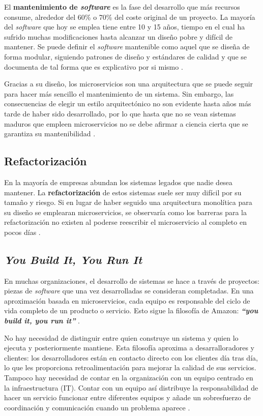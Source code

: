\documentclass[11pt,spanish,listoffigures]{tfgetsinf}
\begin{document}
El \textbf{mantenimiento de \textit{software}} es la fase del desarrollo que más recursos consume, alrededor del 60\% o 70\% del coste original de un proyecto. La mayoría del \textit{software} que hoy se emplea tiene entre 10 y 15 años, tiempo en el cual ha sufrido muchas modificaciones hasta alcanzar un diseño pobre y difícil de mantener. Se puede definir el \textit{software} mantenible como aquel que se diseña de forma modular, siguiendo patrones de diseño y estándares de calidad y que se documenta de tal forma que es explicativo por si mismo \cite{Pressman}.

Gracias a su diseño, los microservicios son una arquitectura que se puede seguir para hacer más sencillo el mantenimiento de un sistema. Sin embargo, las consecuencias de elegir un estilo arquitectónico no son evidente hasta años más tarde de haber sido desarrollado, por lo que hasta que no se vean sistemas maduros que empleen microservicios no se debe afirmar a ciencia cierta que se garantiza su mantenibilidad \cite{Lewis2014}.

\subsection{Refactorización}


En la mayoría de empresas abundan los sistemas legados que nadie desea mantener. La \textbf{refactorización} de estos sistemas suele ser muy difícil por su tamaño y riesgo. Si en lugar de haber seguido una arquitectura monolítica para su diseño se emplearan microservicios, se observaría como los barreras para la refactorización no existen al poderse reescribir el microservicio al completo en pocos días \cite{Eaves2014}.

\subsection{\textit{You Build It, You Run It}}

En muchas organizaciones, el desarrollo de sistemas se hace a través de proyectos: piezas de \textit{software} que una vez desarrolladas se consideran completadas. En una aproximación basada en microservicios, cada equipo es responsable del ciclo de vida completo de un producto o servicio. Esto sigue la filosofía de Amazon: \textbf{\textit{``you build it, you run it''}} \cite{Lewis2014}.

No hay necesidad de distinguir entre quien construye un sistema y quien lo ejecuta y posteriormente mantiene. Esta filosofía aproxima a desarralloradores y clientes: los desarrolladores están en contacto directo con los clientes día tras día, lo que les proporciona retroalimentación para mejorar la calidad de sus servicios. Tampoco hay necesidad de contar en la organización con un equipo centrado en la infraestructura (IT). Contar con un equipo así distribuye la responsabilidad de hacer un servicio funcionar entre diferentes equipos y añade un sobresfuerzo de coordinación y comunicación cuando un problema aparece \cite{Vliet2011}.
\end{document}
